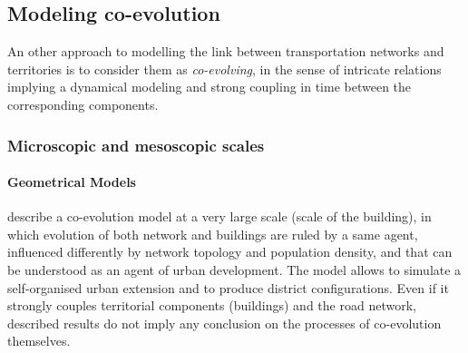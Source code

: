 \documentclass[10pt]{article}
\begin{document}
\subsection{Modeling co-evolution}

An other approach to modelling the link between transportation networks and territories is to consider them as \emph{co-evolving}, in the sense of intricate relations implying a dynamical modeling and strong coupling in time between the corresponding components. 


\subsubsection{Microscopic and mesoscopic scales}



\paragraph{Geometrical Models}

\cite{achibet2014model} describe a co-evolution model at a very large scale (scale of the building), in which evolution of both network and buildings are ruled by a same agent, influenced differently by network topology and population density, and that can be understood as an agent of urban development. The model allows to simulate a self-organised urban extension and to produce district configurations. Even if it strongly couples territorial components (buildings) and the road network, described results do not imply any conclusion on the processes of co-evolution themselves.
\end{document}
